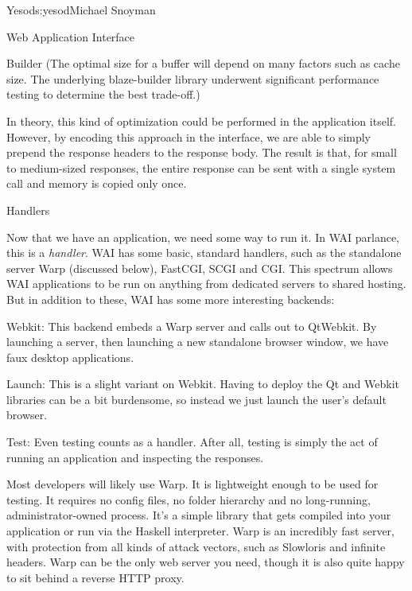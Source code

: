 \begin{aosachapter}{Yesod}{s:yesod}{Michael Snoyman}
\begin{aosasect1}{Web Application Interface}
\begin{aosasect2}{Builder}
(The optimal size for a buffer will depend on many factors such as
cache size. The underlying blaze-builder library underwent significant
performance testing to determine the best trade-off.)

In theory, this kind of optimization could be performed in the
application itself. However, by encoding this approach in the
interface, we are able to simply prepend the response headers
to the response body. The result is that, for small to medium-sized
responses, the entire response can be sent with a single system call
and memory is copied only once.

\end{aosasect2}

\begin{aosasect2}{Handlers}

Now that we have an application, we need some way to run it. In WAI
parlance, this is a \emph{handler}. WAI has some basic, standard
handlers, such as the standalone server Warp (discussed below),
FastCGI, SCGI and CGI. This spectrum allows WAI applications to be run
on anything from dedicated servers to shared hosting. But in
addition to these, WAI has some more interesting backends:

\begin{aosadescription}
  
\item{Webkit:} This backend embeds a Warp server and calls out to
  QtWebkit. By launching a server, then launching a new
  standalone browser window, we have faux desktop applications.

\item{Launch:} This is a slight variant on Webkit. Having to deploy
  the Qt and Webkit libraries can be a bit burdensome, so instead we
  just launch the user's default browser.

\item{Test:} Even testing counts as a handler. After all, testing is
  simply the act of running an application and inspecting the
  responses.

\end{aosadescription}

Most developers will likely use Warp. It is lightweight enough to be
used for testing. It requires no config files, no folder hierarchy and
no long-running, administrator-owned process. It's a simple library
that gets compiled into your application or run via the Haskell
interpreter. Warp is an incredibly fast server, with
protection from all kinds of attack vectors, such as Slowloris and
infinite headers. Warp can be the only web server you need, though it
is also quite happy to sit behind a reverse HTTP proxy.


\end{aosasect2}
\end{aosasect1}
\end{aosachapter}
